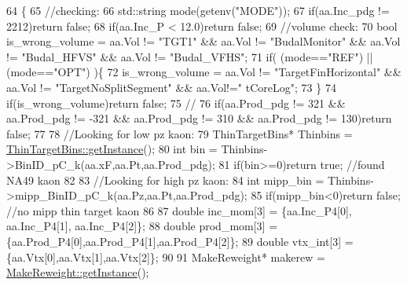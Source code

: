 \begin{DoxyCode}
64                                                                        \{
65     \textcolor{comment}{//checking:}
66     std::string mode(getenv(\textcolor{stringliteral}{"MODE"}));
67     \textcolor{keywordflow}{if}(aa.Inc\_pdg != 2212)\textcolor{keywordflow}{return} \textcolor{keyword}{false};
68     \textcolor{keywordflow}{if}(aa.Inc\_P < 12.0)\textcolor{keywordflow}{return} \textcolor{keyword}{false};
69     \textcolor{comment}{//volume check: }
70     \textcolor{keywordtype}{bool} is\_wrong\_volume = aa.Vol != \textcolor{stringliteral}{"TGT1"} && aa.Vol != \textcolor{stringliteral}{"BudalMonitor"} && aa.Vol != \textcolor{stringliteral}{"Budal\_HFVS"} && aa.Vol
       != \textcolor{stringliteral}{"Budal\_VFHS"};
71     \textcolor{keywordflow}{if}( (mode==\textcolor{stringliteral}{"REF"}) || (mode==\textcolor{stringliteral}{"OPT"}) )\{
72       is\_wrong\_volume = aa.Vol != \textcolor{stringliteral}{"TargetFinHorizontal"} && aa.Vol != \textcolor{stringliteral}{"TargetNoSplitSegment"} && aa.Vol!=\textcolor{stringliteral}{"
      tCoreLog"};
73     \}
74     \textcolor{keywordflow}{if}(is\_wrong\_volume)\textcolor{keywordflow}{return} \textcolor{keyword}{false};
75     \textcolor{comment}{//}
76     \textcolor{keywordflow}{if}(aa.Prod\_pdg != 321 && aa.Prod\_pdg != -321 && aa.Prod\_pdg != 310 && aa.Prod\_pdg != 130)\textcolor{keywordflow}{return} \textcolor{keyword}{false};
77     
78     \textcolor{comment}{//Looking for low pz kaon:}
79     ThinTargetBins*  Thinbins =  \hyperlink{class_neutrino_flux_reweight_1_1_thin_target_bins_aeff5cf7220dd08322f5abac2cbc7ff33}{ThinTargetBins::getInstance}();
80     \textcolor{keywordtype}{int} bin      = Thinbins->BinID\_pC\_k(aa.xF,aa.Pt,aa.Prod\_pdg);
81     \textcolor{keywordflow}{if}(bin>=0)\textcolor{keywordflow}{return} \textcolor{keyword}{true}; \textcolor{comment}{//found NA49 kaon }
82     
83     \textcolor{comment}{//Looking for high pz kaon:}
84     \textcolor{keywordtype}{int} mipp\_bin = Thinbins->mipp\_BinID\_pC\_k(aa.Pz,aa.Pt,aa.Prod\_pdg);
85     \textcolor{keywordflow}{if}(mipp\_bin<0)\textcolor{keywordflow}{return} \textcolor{keyword}{false}; \textcolor{comment}{//no mipp thin target kaon  }
86 
87     \textcolor{keywordtype}{double} inc\_mom[3]  = \{aa.Inc\_P4[0], aa.Inc\_P4[1], aa.Inc\_P4[2]\};
88     \textcolor{keywordtype}{double} prod\_mom[3] = \{aa.Prod\_P4[0],aa.Prod\_P4[1],aa.Prod\_P4[2]\};
89     \textcolor{keywordtype}{double} vtx\_int[3]  = \{aa.Vtx[0],aa.Vtx[1],aa.Vtx[2]\};
90     
91     MakeReweight*  makerew =  \hyperlink{class_neutrino_flux_reweight_1_1_make_reweight_a42d1fa92a1e30bd80538188e0c9d8b4a}{MakeReweight::getInstance}();

\end{DoxyCode}
